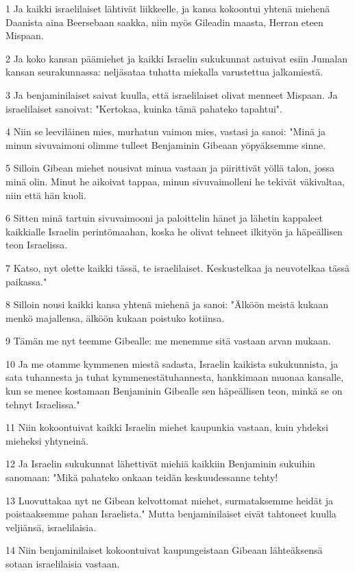 \par 1 Ja kaikki israelilaiset lähtivät liikkeelle, ja kansa kokoontui yhtenä miehenä Daanista aina Beersebaan saakka, niin myös Gileadin maasta, Herran eteen Mispaan.
\par 2 Ja koko kansan päämiehet ja kaikki Israelin sukukunnat astuivat esiin Jumalan kansan seurakunnassa: neljäsataa tuhatta miekalla varustettua jalkamiestä.
\par 3 Ja benjaminilaiset saivat kuulla, että israelilaiset olivat menneet Mispaan. Ja israelilaiset sanoivat: "Kertokaa, kuinka tämä pahateko tapahtui".
\par 4 Niin se leeviläinen mies, murhatun vaimon mies, vastasi ja sanoi: "Minä ja minun sivuvaimoni olimme tulleet Benjaminin Gibeaan yöpyäksemme sinne.
\par 5 Silloin Gibean miehet nousivat minua vastaan ja piirittivät yöllä talon, jossa minä olin. Minut he aikoivat tappaa, minun sivuvaimolleni he tekivät väkivaltaa, niin että hän kuoli.
\par 6 Sitten minä tartuin sivuvaimooni ja paloittelin hänet ja lähetin kappaleet kaikkialle Israelin perintömaahan, koska he olivat tehneet ilkityön ja häpeällisen teon Israelissa.
\par 7 Katso, nyt olette kaikki tässä, te israelilaiset. Keskustelkaa ja neuvotelkaa tässä paikassa."
\par 8 Silloin nousi kaikki kansa yhtenä miehenä ja sanoi: "Älköön meistä kukaan menkö majallensa, älköön kukaan poistuko kotiinsa.
\par 9 Tämän me nyt teemme Gibealle: me menemme sitä vastaan arvan mukaan.
\par 10 Ja me otamme kymmenen miestä sadasta, Israelin kaikista sukukunnista, ja sata tuhannesta ja tuhat kymmenestätuhannesta, hankkimaan muonaa kansalle, kun se menee kostamaan Benjaminin Gibealle sen häpeällisen teon, minkä se on tehnyt Israelissa."
\par 11 Niin kokoontuivat kaikki Israelin miehet kaupunkia vastaan, kuin yhdeksi mieheksi yhtyneinä.
\par 12 Ja Israelin sukukunnat lähettivät miehiä kaikkiin Benjaminin sukuihin sanomaan: "Mikä pahateko onkaan teidän keskuudessanne tehty!
\par 13 Luovuttakaa nyt ne Gibean kelvottomat miehet, surmataksemme heidät ja poistaaksemme pahan Israelista." Mutta benjaminilaiset eivät tahtoneet kuulla veljiänsä, israelilaisia.
\par 14 Niin benjaminilaiset kokoontuivat kaupungeistaan Gibeaan lähteäksensä sotaan israelilaisia vastaan.
